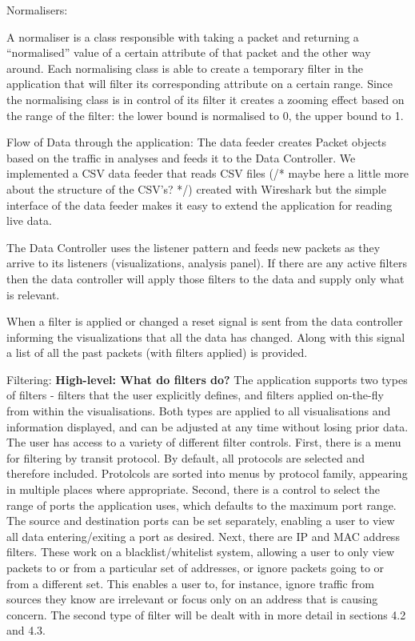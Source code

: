 Normalisers:

A normaliser is a class responsible with taking a packet and returning a ``normalised'' value of a certain attribute of that packet and the other way around. 
Each normalising class is able to create a temporary filter in the application that will filter its corresponding attribute on a certain range. 
Since the normalising class is in control of its filter it creates a zooming effect based on the range of the filter: the lower bound is normalised to 0, the upper bound to 1. 

Flow of Data through the application:
The data feeder creates Packet objects based on the traffic in analyses and feeds it to the Data Controller. 
We implemented a CSV data feeder that reads CSV files (/* maybe here a little more about the structure of the CSV's? */) created with Wireshark but the simple interface of the data feeder makes it easy to extend the application for reading live data.

The Data Controller uses the listener pattern and feeds new packets as they arrive to its listeners (visualizations, analysis panel).
If there are any active filters then the data controller will apply those filters to the data and supply only what is relevant.

When a filter is applied or changed a reset signal is sent from the data controller informing the visualizations that all the data has changed. Along with this signal a list of all the past packets (with filters applied) is provided.

Filtering:
\textbf{High-level: What do filters do?}
The application supports two types of filters - filters that the user explicitly defines, and filters applied on-the-fly from within the visualisations.
Both types are applied to all visualisations and information displayed, and can be adjusted at any time without losing prior data.
The user has access to a variety of different filter controls.  First, there is a menu for filtering by transit protocol. By default, all protocols are selected and therefore included. Protolcols are sorted into menus by protocol family, appearing in multiple places where appropriate. Second, there is a control to select the range of ports the application uses, which defaults to the maximum port range.  The source and destination ports can be set separately, enabling a user to view all data entering/exiting a port as desired.  Next, there are IP and MAC address filters.  These work on a blacklist/whitelist system, allowing a user to only view packets to or from a particular set of addresses, or ignore packets going to or from a different set.  This enables a user to, for instance, ignore traffic from sources they know are irrelevant or focus only on an address that is causing concern.
The second type of filter will be dealt with in more detail in sections 4.2 and 4.3.

